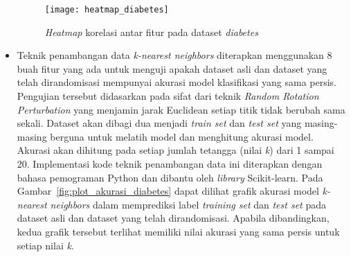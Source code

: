 \begin{itemize}
	\begin{figure}
		\centering
		\texttt{[image: heatmap\_diabetes]}
		\caption{\textit{Heatmap} korelasi antar fitur pada dataset \textit{diabetes}}
		\label{fig:heatmap_diabetes}
	\end{figure}
	\item Teknik penambangan data \textit{k-nearest neighbors} diterapkan menggunakan 8 buah fitur yang ada untuk menguji apakah dataset asli dan dataset yang telah dirandomisasi mempunyai akurasi model klasifikasi yang sama persis. Pengujian tersebut didasarkan pada sifat dari teknik \textit{Random Rotation Perturbation} yang menjamin jarak Euclidean setiap titik tidak berubah sama sekali. Dataset akan dibagi dua menjadi \textit{train set} dan \textit{test set} yang masing-masing berguna untuk melatih model dan menghitung akurasi model. Akurasi akan dihitung pada setiap jumlah tetangga (nilai \textit{k}) dari 1 sampai 20. Implementasi kode teknik penambangan data ini diterapkan dengan bahasa pemograman Python dan dibantu oleh \textit{library} Scikit-learn. Pada Gambar~\ref{fig:plot_akurasi_diabetes} dapat dilihat grafik akurasi model \textit{k-nearest neighbors} dalam memprediksi label \textit{training set} dan \textit{test set} pada dataset asli dan dataset yang telah dirandomisasi. Apabila dibandingkan, kedua grafik tersebut terlihat memiliki nilai akurasi yang sama persis untuk setiap nilai \textit{k}. 


\end{itemize}
